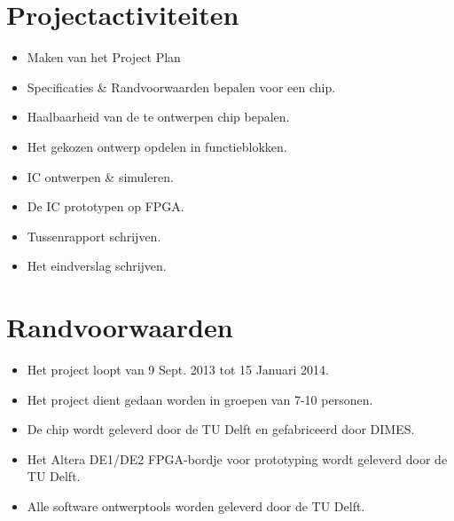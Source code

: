 \documentclass{scrartcl}
\begin{document}
\section{Projectactiviteiten}
\begin{itemize}
\item Maken van het Project Plan
\item Specificaties \&  Randvoorwaarden bepalen voor een chip.
\item Haalbaarheid van de te ontwerpen chip bepalen.
\item Het gekozen ontwerp opdelen in functieblokken.
\item IC ontwerpen \& simuleren.
\item De IC prototypen op FPGA.
\item Tussenrapport schrijven.
\item Het eindverslag schrijven.
\end{itemize}

\section{Randvoorwaarden}
\begin{itemize}
\item Het project loopt van 9 Sept. 2013 tot 15 Januari 2014. 
\item Het project dient gedaan worden in groepen van 7-10 personen.
\item De chip wordt geleverd door de TU Delft en gefabriceerd door DIMES.
\item Het Altera DE1/DE2 FPGA-bordje voor prototyping wordt geleverd door de TU Delft.
\item Alle software ontwerptools worden geleverd door de TU Delft.
\end{itemize}

%
\end{document}

